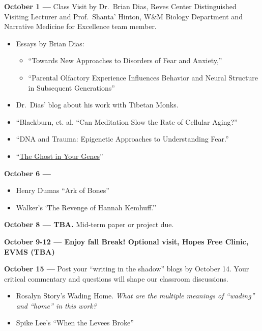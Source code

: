 \documentclass[12pt]{article}
\providecommand{\tightlist}{%
  \setlength{\itemsep}{0pt}\setlength{\parskip}{0pt}}
\begin{document}
\textbf{October 1 ---} Class Visit by Dr.~Brian Dias, Reves Center
Distinguished Visiting Lecturer and Prof.~Shanta' Hinton, W\&M Biology
Department and Narrative Medicine for Excellence team member.

\begin{itemize}
\tightlist
\item
  Essays by Brian Dias:

  \begin{itemize}
  \tightlist
  \item
    ``Towards New Approaches to Disorders of Fear and Anxiety,''
  \item
    ``Parental Olfactory Experience Influences Behavior and Neural
    Structure in Subsequent Generations''
  \end{itemize}
\item
  Dr.~Dias' blog about his work with Tibetan Monks.
\item
  ``Blackburn, et. al. ``Can Meditation Slow the Rate of Cellular
  Aging?''
\item
  ``DNA and Trauma: Epigenetic Approaches to Understanding Fear.''
\item
  ``\href{https://www.youtube.com/watch?v=fMxgkSgZoJs}{The Ghost in Your
  Genes}''
\end{itemize}

\textbf{October 6 ---}

\begin{itemize}
\tightlist
\item
  Henry Dumas ``Ark of Bones''
\item
  Walker's `The Revenge of Hannah Kemhuff.''
\end{itemize}

\textbf{October 8 --- TBA.} Mid-term paper or project due.

\textbf{October 9-12 --- Enjoy fall Break! Optional visit, Hopes Free
Clinic, EVMS (TBA)}

\textbf{October 15 ---} Post your ``writing in the shadow'' blogs by
October 14. Your critical commentary and questions will shape our
classroom discussions.

\begin{itemize}
\tightlist
\item
  Rosalyn Story's Wading Home. \emph{What are the multiple meanings of
  ``wading'' and ``home'' in this work?}
\item
  Spike Lee's ``When the Levees Broke''
\end{itemize}
\end{document}
